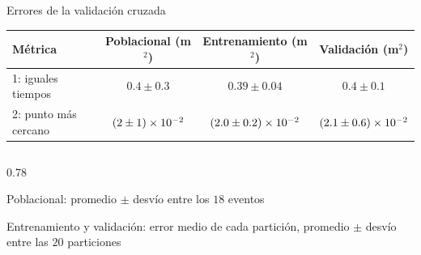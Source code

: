 \begin{frame}{Errores de la validación cruzada}
  \centering
  \renewcommand{\arraystretch}{1.5}
  \begin{tabular}{lccc}
    \hline
    Métrica & Poblacional (m$^2$) & Entrenamiento (m$^2$) & Validación (m$^2$) \\
    \hline
    1: iguales tiempos & $0.4 \pm 0.3$ & $0.39 \pm 0.04$ & $0.4 \pm 0.1$ \\
    2: punto más cercano & $(2 \pm 1)\times 10^{-2}$ & $(2.0 \pm 0.2)\times 10^{-2}$ & $(2.1 \pm 0.6)\times 10^{-2}$ \\
    \hline
  \end{tabular}

  \vspace{12pt}
  \begin{columns}
    \begin{column}{0.78\textwidth}
      \begin{aclaraciones}
        \item Poblacional: promedio $\pm$ desvío entre los $18$ eventos
        \item Entrenamiento y validación: error medio de cada partición, promedio $\pm$ desvío entre las $20$ particiones
      \end{aclaraciones}
    \end{column}
  \end{columns}
\end{frame}
